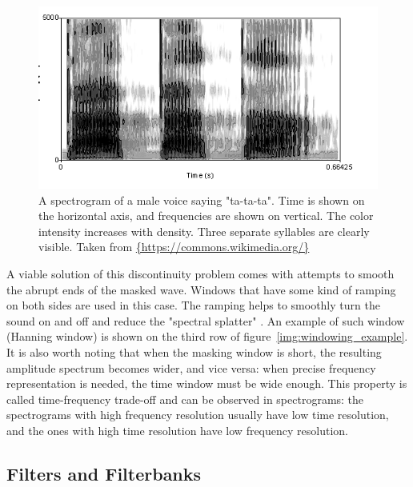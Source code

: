 \begin{figure}[t]
	\centering
	\includegraphics[height=0.25\textheight]{include/spectrogram_example}
	\caption[An example of a spectrogram]{A spectrogram of a male voice saying "ta-ta-ta". Time is shown on the horizontal axis, and frequencies are shown on vertical. The color intensity increases with density. Three separate syllables are clearly visible. Taken from \url{{https://commons.wikimedia.org/}}}
	\label{img:spectrogram_example}
\end{figure}

A viable solution of this discontinuity problem comes with attempts to smooth the abrupt ends of the masked wave. Windows that have some kind of ramping on both sides are used in this case. The ramping helps to smoothly turn the sound on and off and reduce the "spectral splatter" \cite{Schnupp2011}. An example of such window (Hanning window) is shown on the third row of fig\-ure~\ref{img:windowing_example}.\\

It is also worth noting that when the masking window is short, the resulting amplitude spectrum becomes wider, and vice versa: when precise frequency representation is needed, the time window must be wide enough. This property is called time-frequency trade-off and can be observed in spectrograms: the spectrograms with high frequency resolution usually have low time resolution, and the ones with high time resolution have low frequency resolution.

\subsection{Filters and Filterbanks}\label{section:math_filters}

